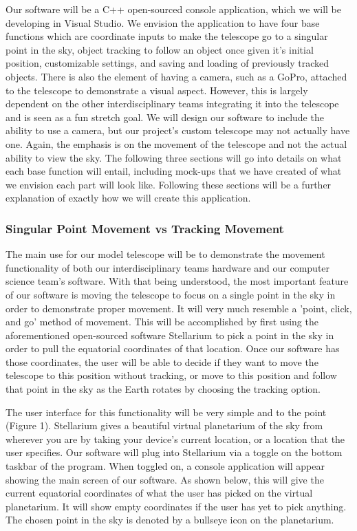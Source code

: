 \documentclass[12pt]{report}
\begin{document}
Our software will be a C++ open-sourced console application, which we will be developing in Visual Studio. We envision the application to have four base functions which are coordinate inputs to make the telescope go to a singular point in the sky, object tracking to follow an object once given it's initial position, customizable settings, and saving and loading of previously tracked objects. There is also the element of having a camera, such as a GoPro, attached to the telescope to demonstrate a visual aspect. However, this is largely dependent on the other interdisciplinary teams integrating it into the telescope and is seen as a fun stretch goal. We will design our software to include the ability to use a camera, but our project's custom telescope may not actually have one. Again, the emphasis is on the movement of the telescope and not the actual ability to view the sky. The following three sections will go into details on what each base function will entail, including mock-ups that we have created of what we envision each part will look like. Following these sections will be a further explanation of exactly how we will create this application.

\subsubsection*{Singular Point Movement vs Tracking Movement}

The main use for our model telescope will be to demonstrate the movement functionality of both our interdisciplinary teams hardware and our computer science team's software. With that being understood, the most important feature of our software is moving the telescope to focus on a single point in the sky in order to demonstrate proper movement. It will very much resemble a 'point, click, and go' method of movement. This will be accomplished by first using the aforementioned open-sourced software Stellarium to pick a point in the sky in order to pull the equatorial coordinates of that location. Once our software has those coordinates, the user will be able to decide if they want to move the telescope to this position without tracking, or move to this position and follow that point in the sky as the Earth rotates by choosing the tracking option. 

The user interface for this functionality will be very simple and to the point (Figure 1). Stellarium gives a beautiful virtual planetarium of the sky from wherever you are by taking your device's current location, or a location that the user specifies. Our software will plug into Stellarium via a toggle on the bottom taskbar of the program. When toggled on, a console application will appear showing the main screen of our software. As shown below, this will give the current equatorial coordinates of what the user has picked on the virtual planetarium. It will show empty coordinates if the user has yet to pick anything. The chosen point in the sky is denoted by a bullseye icon on the planetarium.
\end{document}
